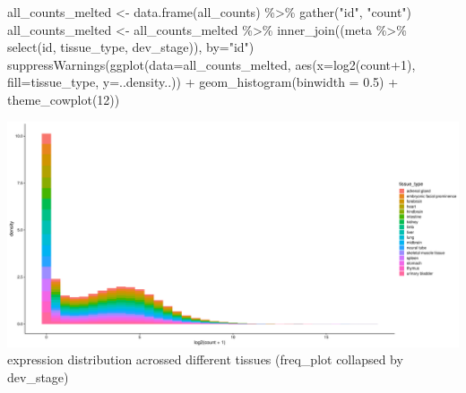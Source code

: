 \documentclass[
]{article}
\newenvironment{Shaded}{\begin{snugshade}}{\end{snugshade}}
\newcommand{\AttributeTok}[1]{\textcolor[rgb]{0.77,0.63,0.00}{#1}}
\newcommand{\DecValTok}[1]{\textcolor[rgb]{0.00,0.00,0.81}{#1}}
\newcommand{\FloatTok}[1]{\textcolor[rgb]{0.00,0.00,0.81}{#1}}
\newcommand{\FunctionTok}[1]{\textcolor[rgb]{0.00,0.00,0.00}{#1}}
\newcommand{\NormalTok}[1]{#1}
\newcommand{\OtherTok}[1]{\textcolor[rgb]{0.56,0.35,0.01}{#1}}
\newcommand{\SpecialCharTok}[1]{\textcolor[rgb]{0.00,0.00,0.00}{#1}}
\newcommand{\StringTok}[1]{\textcolor[rgb]{0.31,0.60,0.02}{#1}}
\begin{document}
\begin{Shaded}
\begin{Highlighting}[]
\NormalTok{all\_counts\_melted }\OtherTok{\textless{}{-}} \FunctionTok{data.frame}\NormalTok{(all\_counts) }\SpecialCharTok{\%\textgreater{}\%} \FunctionTok{gather}\NormalTok{(}\StringTok{"id"}\NormalTok{, }\StringTok{"count"}\NormalTok{)}
\NormalTok{all\_counts\_melted }\OtherTok{\textless{}{-}}\NormalTok{ all\_counts\_melted }\SpecialCharTok{\%\textgreater{}\%} \FunctionTok{inner\_join}\NormalTok{((meta }\SpecialCharTok{\%\textgreater{}\%} \FunctionTok{select}\NormalTok{(id, tissue\_type, dev\_stage)), }\AttributeTok{by=}\StringTok{"id"}\NormalTok{)}
  \FunctionTok{suppressWarnings}\NormalTok{(}\FunctionTok{ggplot}\NormalTok{(}\AttributeTok{data=}\NormalTok{all\_counts\_melted, }\FunctionTok{aes}\NormalTok{(}\AttributeTok{x=}\FunctionTok{log2}\NormalTok{(count}\SpecialCharTok{+}\DecValTok{1}\NormalTok{), }\AttributeTok{fill=}\NormalTok{tissue\_type, }\AttributeTok{y=}\NormalTok{..density..)) }\SpecialCharTok{+} \FunctionTok{geom\_histogram}\NormalTok{(}\AttributeTok{binwidth =} \FloatTok{0.5}\NormalTok{) }\SpecialCharTok{+} \FunctionTok{theme\_cowplot}\NormalTok{(}\DecValTok{12}\NormalTok{))  }
\end{Highlighting}
\end{Shaded}

\includegraphics{Exploration_files/figure-latex/unnamed-chunk-13-1.pdf}
expression distribution acrossed different tissues (freq\_plot collapsed
by dev\_stage)
\end{document}

